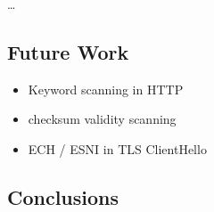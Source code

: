  \dots

\subsection{Future Work} \label{sec:discussion:future}

\begin{itemize}
	\item Keyword scanning in HTTP
	\item checksum validity scanning
	\item ECH / ESNI in TLS ClientHello
\end{itemize}


\subsection{Conclusions} \label{sec:discussion:conclusions}
